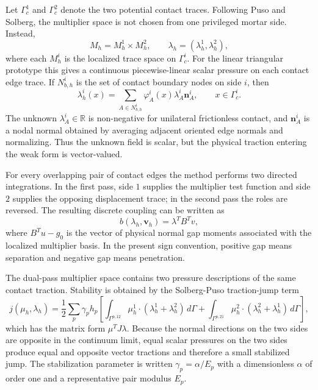 \documentclass[11pt]{article}
\newcommand{\R}{\mathbb{R}}
\newcommand{\vv}{\boldsymbol{v}}
\newcommand{\nn}{\boldsymbol{n}}
\begin{document}
Let $\Gamma_c^1$ and $\Gamma_c^2$ denote the two potential contact traces.
Following Puso and Solberg, the multiplier space is not chosen from one
privileged mortar side.  Instead,
\[
    M_h=M_h^1\times M_h^2,
    \qquad
    \lambda_h=(\lambda_h^1,\lambda_h^2),
\]
where each $M_h^i$ is the localized trace space on $\Gamma_c^i$.  For the
linear triangular prototype this gives a continuous piecewise-linear scalar
pressure on each contact edge trace.  If $N_{b,h}^i$ is the set of contact
boundary nodes on side $i$, then
\[
    \lambda_h^i(x)
    =
    \sum_{A\in N_{b,h}^i}
    \varphi_A^i(x)\lambda_A^i\nn_A^i ,
    \qquad x\in\Gamma_c^i .
\]
The unknown $\lambda_A^i\in\R$ is non-negative for unilateral frictionless
contact, and $\nn_A^i$ is a nodal normal obtained by averaging adjacent
oriented edge normals and normalizing.  Thus the unknown field is scalar, but
the physical traction entering the weak form is vector-valued.

For every overlapping pair of contact edges the method performs two directed
integrations.  In the first pass, side $1$ supplies the multiplier test
function and side $2$ supplies the opposing displacement trace; in the second
pass the roles are reversed.  The resulting discrete coupling can be written
as
\[
    b(\lambda_h,\vv_h)=\lambda^T B^T v,
\]
where $B^T u-g_0$ is the vector of physical normal gap moments associated
with the localized multiplier basis.  In the present sign convention, positive
gap means separation and negative gap means penetration.

The dual-pass multiplier space contains two pressure descriptions of the same
contact traction.  Stability is obtained by the Solberg-Puso traction-jump
term
\[
    j(\mu_h,\lambda_h)
    =
    \frac{1}{2}
    \sum_p
    \gamma_p h_p
    \left[
    \int_{\Gamma^{p,12}}
    \mu_h^1\cdot(\lambda_h^1+\lambda_h^2)\,d\Gamma
    +
    \int_{\Gamma^{p,21}}
    \mu_h^2\cdot(\lambda_h^2+\lambda_h^1)\,d\Gamma
    \right],
\]
which has the matrix form $\mu^T J\lambda$.  Because the normal directions on
the two sides are opposite in the continuum limit, equal scalar pressures on
the two sides produce equal and opposite vector tractions and therefore a
small stabilized jump.  The stabilization parameter is written
$\gamma_p=\alpha/E_p$ with a dimensionless $\alpha$ of order one and a
representative pair modulus $E_p$.
\end{document}
